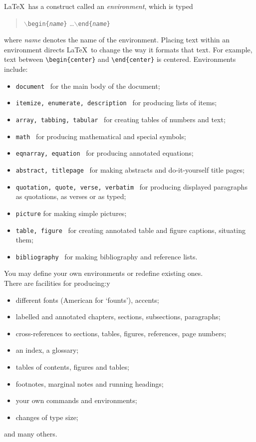 \LaTeX\ has a construct called an {\em environment}, which is typed
\begin{quote}
{\tt $\backslash$begin\{{\sl name}\}} \ldots {\tt $\backslash$end\{{\sl name}\}}
\end{quote}
where {\em name} denotes the name of the environment.  Placing text within an
environment directs \LaTeX\ to change the way it formats that text.  For
example, text between \hbox{\verb|\begin{center}|} and
\hbox{\verb|\end{center}|} is centered.   Environments include:
\begin{itemize}
\item
{\tt document} ~for the main body of the document;
\item
{\tt itemize, enumerate, description} ~for producing lists of items;
\item
{\tt array, tabbing, tabular} ~for creating tables of numbers and text;
\item
{\tt math} ~for producing mathematical and special symbols;
\item
{\tt eqnarray, equation} ~for producing annotated equations;
\item
{\tt abstract, titlepage} ~for making abstracts and do-it-yourself 
title pages;
\item
{\tt quotation, quote, verse, verbatim} ~for producing displayed
paragraphs as quotations, as verses or as typed;
\item
{\tt picture} for making simple pictures;
\item
{\tt table, figure} ~for creating annotated table and figure captions,
situating them;
\item
{\tt bibliography} ~for making bibliography and reference lists.
\end{itemize}
You may define your own environments or redefine existing ones.\medskip\\
There are facilities for producing:y


\begin{itemize}
\item
different fonts (American for `founts'), accents;
\item
labelled and annotated chapters, sections, subsections, paragraphs;
\item
cross-references to sections, tables, figures, references, page numbers;
\item
an index, a glossary;
\item
tables of contents, figures and tables;
\item
footnotes, marginal notes and running headings;
\item
your own commands and environments;
\item
changes of type size;
\end{itemize}
and many others. 

